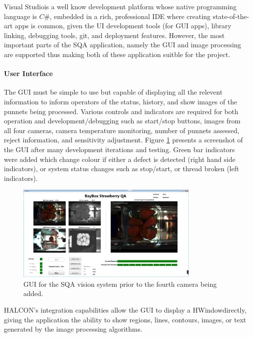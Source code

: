 \documentclass[fleqn,twoside]{article}
\begin{document}
Visual Studio\textregistered is a well know development platform whose native programming language is $C\#$, embedded in a rich, professional IDE where creating state-of-the-art apps is common, given the UI development tools (for GUI apps), library linking, debugging tools, git, and deployment features. However, the most important parts of the SQA application, namely the GUI and image processing are supported thus making both of these application suitble for the project.


\paragraph{User Interface}

The GUI must be simple to use but capable of displaying all the relevent information to inform operators of the status, history, and show images of the punnets being processed. Various controls and indicators are required for both operation and development/debugging such as start/stop buttons, images from all four cameras, camera temperature monitoring, number of punnets assessed, reject information, and sensitivity adjustment. Figure \ref{fig:GUI} presents a screenshot of the GUI after many development iterations and testing. Green bar indicators were added which change colour if either a defect is detected (right hand side indicators), or system status changes such as stop/start, or thread broken (left indicators).  


\begin{figure}[h]
	\centering
	\includegraphics[width=0.8\textwidth]{GUI.png}
	\caption{GUI for the SQA vision system prior to the fourth camera being added.}
	\label{fig:GUI}
\end{figure}
  
  
HALCON\texttrademark's integration capabilities allow the GUI to display a HWindow\texttrademark directly, giving the application the ability to show regions, lines, contours, images, or text generated by the image processing algorithms. 
\end{document}
